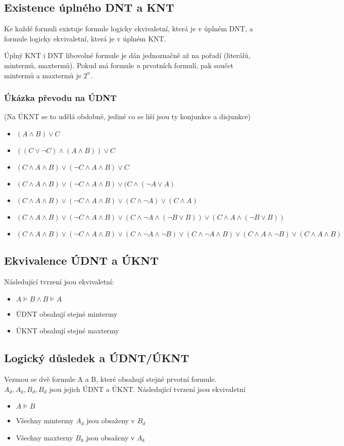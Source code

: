 \documentclass{szzclass}
\begin{document}
\subsection{Existence úplného DNT a KNT}
Ke každé formuli existuje formule logicky ekvivaletní, která je v úplném DNT, a formule logicky ekvivaletní, která je v úplném KNT.

Úplný KNT i DNT libovolné formule je dán jednoznačně až na pořadí (literálů, mintermů, maxtermů). Pokud má formule \textit{n} prvotních
formulí, pak součet mintermů a maxtermů je $2^n$.
\subsubsection{Úkázka převodu na ÚDNT}
(Na ÚKNT se to udělá obdobně, jediné co se liší jsou ty konjunkce a disjunkce)
\begin{itemize}
	\item $(A \wedge B) \vee C$
	\item $((C \vee \neg C) \wedge (A \wedge B)) \vee C$
	\item $(C \wedge A \wedge B) \vee (\neg C \wedge A \wedge B) \vee C$
	\item $(C \wedge A \wedge B) \vee (\neg C \wedge A \wedge B) \vee (C \wedge (\neg A \vee A)$
	\item $(C \wedge A \wedge B) \vee (\neg C \wedge A \wedge B) \vee (C \wedge \neg A) \vee (C \wedge A)$
	\item $(C \wedge A \wedge B) \vee (\neg C \wedge A \wedge B) \vee (C \wedge \neg A \wedge (\neg B \vee B)) \vee (C \wedge A \wedge (\neg B \vee B))$
	\item $(C \wedge A \wedge B) \vee (\neg C \wedge A \wedge B) \vee (C \wedge \neg A \wedge \neg B) \vee (C \wedge \neg A \wedge B) \vee (C \wedge A \wedge \neg B) \vee (C \wedge A \wedge B)$
\end{itemize}
\subsection{Ekvivalence ÚDNT a ÚKNT}
Následující tvrzení jsou ekvivaletní:
\begin{itemize}
	\item $A \models B \wedge B \models A$
	\item ÚDNT obsahují stejné mintermy
	\item ÚKNT obsahují stejné maxtermy
\end{itemize}
\subsection{Logický důsledek a ÚDNT/ÚKNT}
Vezmou se dvě formule A a B, které obsahují stejné prvotní formule. $A_d, A_k, B_d, B_d$ jsou jejich ÚDNT a ÚKNT.
Následující tvrzení jsou ekvivaletní
\begin{itemize}
	\item $A \models B$
	\item Všechny mintermy $A_d$ jsou obsaženy v $B_d$
	\item Všechny maxterny $B_k$ jsou obsaženy v $A_k$
\end{itemize}
\end{document}
